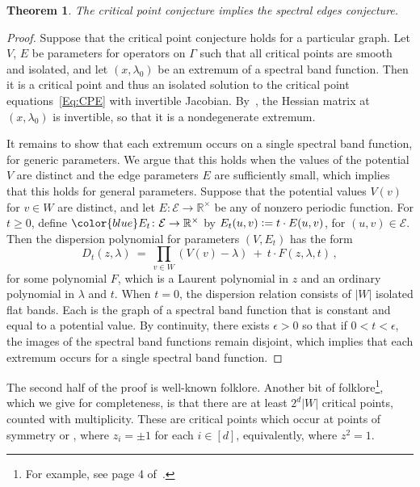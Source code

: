 \documentclass[12pt]{amsart}
\newtheorem{Theorem}{Theorem}[section]
\theoremstyle{remark}
\newcommand{\RR}{{\mathbb R}}
\newcommand{\calE}{{\mathcal E}}
\newcommand{\defcolor}[1]{{\color{blue}#1}}
\newcommand{\demph}[1]{\defcolor{{\sl #1}}}
\begin{document}
\begin{Theorem}\label{Th:CPC_SEC}
  The critical point conjecture implies the spectral edges conjecture.
\end{Theorem}
\begin{proof}
  Suppose that the critical point conjecture holds for a particular graph.
  Let $V$, $E$ be parameters for operators on $\Gamma$ such that all critical points are smooth and isolated, and let  
  \defcolor{$(x,\lambda_0)$} be an extremum of a spectral band function.
  Then it is a critical point and thus an isolated solution to the critical point equations~\eqref{Eq:CPE}
  with invertible Jacobian.
  By~\cite[Lem.\ 5.1]{FS24}, the  Hessian matrix at $(x,\lambda_0)$ is invertible, so that it is a
  nondegenerate extremum.

  It remains to show that each extremum occurs on a single spectral band function, for generic parameters.
  We argue that this holds when the values of the potential $V$ are distinct and the edge parameters $E$ are sufficiently small,
  which implies that this holds for general parameters.
  Suppose that the potential values $V(v)$ for $v\in W$ are distinct, and let $E\colon\calE\to\RR^\times$ be any 
  of nonzero periodic function.
  For $t\geq 0$, define $\defcolor{E_t}\colon\calE\to\RR^\times$ by $E_t(u,v)\vcentcolon= t\cdot E(u,v)$, for $(u,v)\in\calE$.
  Then the dispersion polynomial for parameters $(V,E_t)$  has the form
  \[
      D_t(z,\lambda)\ =\ \prod_{v\in W}(V(v)-\lambda)\ +\ t\cdot F(z,\lambda,t)\,,
  \]
  for some polynomial $F$, which is a Laurent polynomial in $z$ and an ordinary polynomial in $\lambda$ and $t$.
  When $t=0$, the dispersion relation consists of $|W|$ isolated flat bands.
  Each is the graph of a spectral band function that is constant and equal to a potential value.
  By continuity, there exists $\epsilon>0$ so that if $0<t<\epsilon$, the images of the spectral band functions remain
  disjoint, which implies that each extremum occurs for a single spectral band function.
\end{proof}

The second half of the proof is well-known folklore.
Another bit of folklore\footnote{For example, see page 4 of~\cite{ABG}.}, which we give for completeness, is that
there are at least $2^d|W|$ critical points, counted with multiplicity.
These are critical points which occur at points of symmetry or \demph{corner points}, where $z_i = \pm 1$
for each $i \in [d]$, equivalently, where $z^2=1$.
\end{document}
